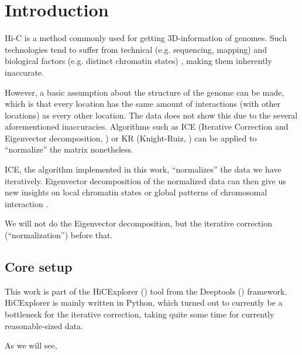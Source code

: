 \chapter{Introduction}\label{chap:introduction}

Hi-C is a method commonly used for getting 3D-information of genomes. Such
technologies tend to suffer from technical (e.g. sequencing, mapping)
\cite{pmid21646344} and biological factors (e.g. distinct chromatin states)
\cite{pmid19693276}, making them inherently inaccurate.

However, a basic assumption about the structure of the genome can be made,
which is that every location has the same amount of interactions (with other
locations) as every other location. The data does not show this due to the
several aforementioned inaccuracies. Algorithms such as ICE (Iterative
Correction and Eigenvector decomposition, ) or KR (Knight-Ruiz,
) can be applied to ``normalize'' the matrix nonetheless.

ICE, the algorithm implemented in this work, ``normalizes'' the data we
have iteratively. Eigenvector decomposition of the normalized data can then
give us new insights on local chromatin states or global patterns of
chromosomal interaction \cite{imakaev2012iterative}.

We will not do the Eigenvector decomposition, but the iterative correction
(``normalization'') before that.


\section{Core setup}\label{sec:setup}

This work is part of the HiCExplorer () tool from the
Deeptools () framework. HiCExplorer is mainly written in
Python, which turned out to currently be a bottleneck for the iterative
correction, taking quite some time for currently reasonable-sized data.

As we will see, 





